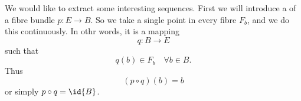 We would like to extract some interesting sequences. First we
will introduce a %
% 
% 
of a fibre bundle $p\colon E\to B$. So we take a single point in
every fibre $F_{b}$, and we do this continuously. In othr words,
it is a mapping
\begin{equation}
q\colon B\to E
\end{equation}
such that
\begin{equation}
q(b)\in F_{b}\quad\forall b\in B.
\end{equation}
Thus
\begin{equation}
(p\circ q)(b)=b
\end{equation}
or simply $p\circ q=\id{B}$.

